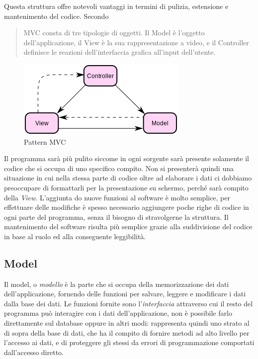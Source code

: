 Questa struttura offre notevoli vantaggi in termini di pulizia, estensione e mantenimento del codice. Secondo \cite[p. 4]{designpatterns}
\begin{quote}
MVC consta di tre tipologie di oggetti. Il Model è l'oggetto dell'applicazione, il View è la sua rappresentazione a video, e il Controller definisce le reazioni dell'interfaccia grafica all'input dell'utente.
\end{quote}

\begin{figure}[ht!]
	\caption{Pattern MVC}
	\label{img:mvc}
	\centering
		\includegraphics[width=\textwidth]{img/mvc1.png}
\end{figure}

Il programma sarà più pulito siccome in ogni sorgente sarà presente solamente il codice che si occupa di uno specifico compito. Non si presenterà quindi una situazione in cui nella stessa parte di codice oltre ad elaborare i dati ci dobbiamo preoccupare di formattarli per la presentazione su schermo, perché sarà compito della \emph{View}. L'aggiunta do nuove funzioni al software è molto semplice, per effettuare delle modifiche è spesso necessario aggiungere poche righe di codice in ogni parte del programma, senza il bisogno di stravolgerne la struttura. Il mantenimento del software risulta più semplice grazie alla suddivisione del codice in base al ruolo ed alla conseguente leggibilità.


\subsection{Model}
Il model, o \emph{modello} è la parte che si occupa della memorizzazione dei dati dell'applicazione, fornendo delle funzioni per salvare, leggere e modificare i dati dalla base dei dati. Le funzioni fornite sono l'\emph{interfaccia} attraverso cui il resto del programma può interagire con i dati dell'applicazione, non è possibile farlo direttamente sul database oppure in altri modi: rappresenta quindi uno strato al di sopra della base di dati, che ha il compito di fornire metodi ad alto livello per l'accesso ai dati, e di proteggere gli stessi da errori di programmazione comportati dall'accesso diretto.


